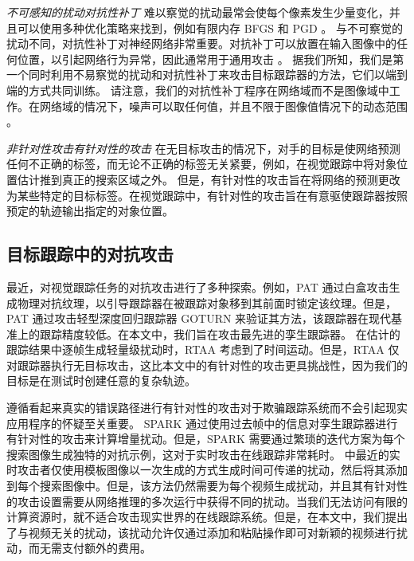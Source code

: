 \textit{不可感知的扰动对抗性补丁} 难以察觉的扰动最常会使每个像素发生少量变化，并且可以使用多种优化策略来找到，例如有限内存 BFGS \cite{intriguing} 和 PGD \cite{PGD}。
与不可察觉的扰动不同，对抗性补丁对神经网络非常重要。对抗补丁可以放置在输入图像中的任何位置，以引起网络行为异常，因此通常用于通用攻击 \cite{patch}。
据我们所知，我们是第一个同时利用不易察觉的扰动和对抗性补丁来攻击目标跟踪器的方法，它们以端到端的方式共同训练。
请注意，我们的对抗性补丁程序在网络域而不是图像域中工作。在网络域的情况下，噪声可以取任何值，并且不限于图像值情况下的动态范围  \cite{karmon2018lavan}。

\textit{非针对性攻击有针对性的攻击} 在无目标攻击的情况下，对手的目标是使网络预测任何不正确的标签，而无论不正确的标签无关紧要，例如，在视觉跟踪中将对象位置估计推到真正的搜索区域之外。
但是，有针对性的攻击旨在将网络的预测更改为某些特定的目标标签。在视觉跟踪中，有针对性的攻击旨在有意驱使跟踪器按照预定的轨迹输出指定的对象位置。

\subsection{目标跟踪中的对抗攻击}

最近，对视觉跟踪任务的对抗攻击进行了多种探索。例如，PAT \cite{PAT} 通过白盒攻击生成物理对抗纹理，以引导跟踪器在被跟踪对象移到其前面时锁定该纹理。但是，PAT 通过攻击轻型深度回归跟踪器 GOTURN \cite{GOTURN} 来验证其方法，该跟踪器在现代基准上的跟踪精度较低。在本文中，我们旨在攻击最先进的孪生跟踪器。
在估计的跟踪结果中逐帧生成轻量级扰动时，RTAA \cite{RTAA} 考虑到了时间运动。但是，RTAA 仅对跟踪器执行无目标攻击，这比本文中的有针对性的攻击更具挑战性，因为我们的目标是在测试时创建任意的复杂轨迹。

遵循看起来真实的错误路径进行有针对性的攻击对于欺骗跟踪系统而不会引起现实应用程序的怀疑至关重要。
SPARK \cite{SPARK} 通过使用过去帧中的信息对孪生跟踪器进行有针对性的攻击来计算增量扰动。但是，SPARK 需要通过繁琐的迭代方案为每个搜索图像生成独特的对抗示例，这对于实时攻击在线跟踪非常耗时。\cite{TTP} 中最近的实时攻击者仅使用模板图像以一次生成的方式生成时间可传递的扰动，然后将其添加到每个搜索图像中。但是，该方法仍然需要为每个视频生成扰动，并且其有针对性的攻击设置需要从网络推理的多次运行中获得不同的扰动。当我们无法访问有限的计算资源时，就不适合攻击现实世界的在线跟踪系统。但是，在本文中，我们提出了与视频无关的扰动，该扰动允许仅通过添加和粘贴操作即可对新颖的视频进行扰动，而无需支付额外的费用。

